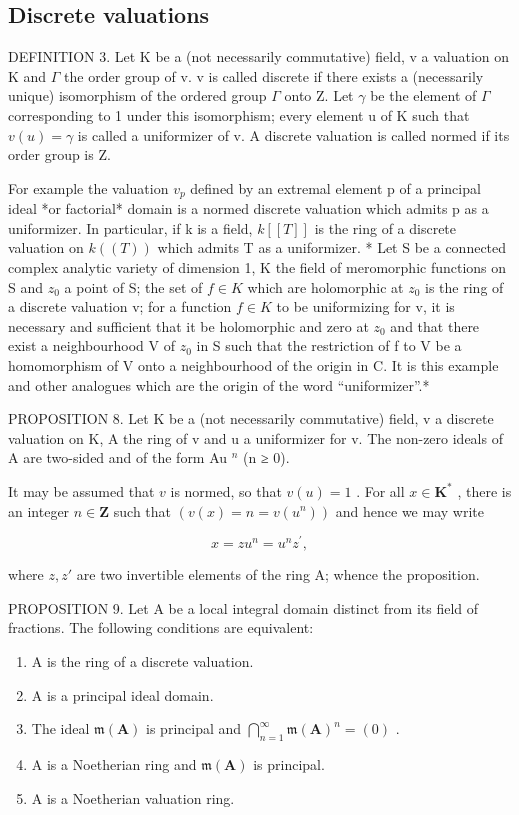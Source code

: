 \subsection{Discrete valuations}

DEFINITION 3. Let K be a (not necessarily commutative) field, v a valuation on K and \(\Gamma\) the order group of v. v is called discrete if there exists a (necessarily unique) isomorphism of the ordered group \(\Gamma\) onto Z. Let \(\gamma\) be the element of \(\Gamma\) corresponding to 1 under this isomorphism; every element u of K such that \(v(u) = \gamma\) is called a uniformizer of v. A discrete valuation is called normed if its order group is Z.

For example the valuation \(v_{p}\) defined by an extremal element p of a principal ideal *or factorial* domain is a normed discrete valuation which admits p as a uniformizer. In particular, if k is a field, \(k[[T]]\) is the ring of a discrete valuation on \(k((T))\) which admits T as a uniformizer. * Let S be a connected complex analytic variety of dimension 1, K the field of meromorphic functions on S and \(z_{0}\) a point of S; the set of \(f \in K\) which are holomorphic at \(z_{0}\) is the ring of a discrete valuation v; for a function \(f \in K\) to be uniformizing for v, it is necessary and sufficient that it be holomorphic and zero at \(z_{0}\) and that there exist a neighbourhood V of \(z_{0}\) in S such that the restriction of f to V be a homomorphism of V onto a neighbourhood of the origin in C. It is this example and other analogues which are the origin of the word ``uniformizer''.*

PROPOSITION 8. Let K be a (not necessarily commutative) field, v a discrete valuation on K, A the ring of v and u a uniformizer for v. The non-zero ideals of A are two-sided and of the form Au \(^{n}\) (n ≥ 0).

It may be assumed that \(v\) is normed, so that \(v(u) = 1\) . For all \(x \in \mathbf{K}^*\) , there is an integer \(n \in \mathbf{Z}\) such that \((v(x) = n = v(u^n))\) and hence we may write

\[
x = z u ^ {n} = u ^ {n} z ^ {\prime},
\]

where \(z, z'\) are two invertible elements of the ring A; whence the proposition.

PROPOSITION 9. Let A be a local integral domain distinct from its field of fractions. The following conditions are equivalent:

\begin{enumerate}
\def\labelenumi{(\alph{enumi})}
\item
  A is the ring of a discrete valuation.
\item
  A is a principal ideal domain.
\item
  The ideal \(\mathfrak{m}(\mathbf{A})\) is principal and \(\bigcap_{n=1}^{\infty} \mathfrak{m}(\mathbf{A})^n = (0)\) .
\item
  A is a Noetherian ring and \(\mathfrak{m}(\mathbf{A})\) is principal.
\item
  A is a Noetherian valuation ring.
\end{enumerate}

